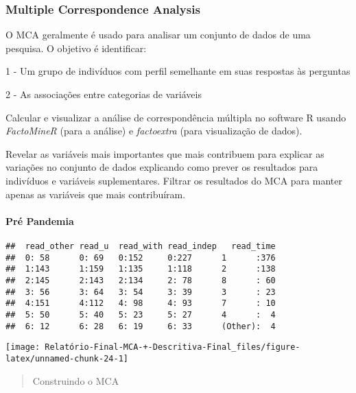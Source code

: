 \documentclass[
]{article}
\begin{document}
\hypertarget{multiple-correspondence-analysis}{%
\subsubsection{\texorpdfstring{\textbf{Multiple Correspondence
Analysis}}{Multiple Correspondence Analysis}}\label{multiple-correspondence-analysis}}

O MCA geralmente é usado para analisar um conjunto de dados de uma
pesquisa. O objetivo é identificar:

1 - Um grupo de indivíduos com perfil semelhante em suas respostas às
perguntas

2 - As associações entre categorias de variáveis

Calcular e visualizar a análise de correspondência múltipla no software
R usando \emph{FactoMineR} (para a análise) e \emph{factoextra} (para
visualização de dados).

Revelar as variáveis mais importantes que mais contribuem para explicar
as variações no conjunto de dados explicando como prever os resultados
para indivíduos e variáveis suplementares. Filtrar os resultados do MCA
para manter apenas as variáveis que mais contribuíram.

\hypertarget{pruxe9-pandemia}{%
\paragraph{\texorpdfstring{\textbf{Pré
Pandemia}}{Pré Pandemia}}\label{pruxe9-pandemia}}

\begin{verbatim}
##  read_other read_u  read_with read_indep   read_time  
##  0: 58      0: 69   0:152     0:227      1      :376  
##  1:143      1:159   1:135     1:118      2      :138  
##  2:145      2:143   2:134     2: 78      8      : 60  
##  3: 56      3: 64   3: 54     3: 39      3      : 23  
##  4:151      4:112   4: 98     4: 93      7      : 10  
##  5: 50      5: 40   5: 23     5: 27      4      :  4  
##  6: 12      6: 28   6: 19     6: 33      (Other):  4
\end{verbatim}

\begin{center}\texttt{[image: Relatório-Final-MCA-+-Descritiva-Final\_files/figure-latex/unnamed-chunk-24-1]} \end{center}

\begin{quote}
Construindo o MCA
\end{quote}
\end{document}
